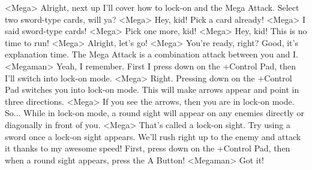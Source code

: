 <Mega> Alright, next up I'll cover how to lock-on and the Mega Attack. 
Select two sword-type cards, will ya? 
<Mega> Hey, kid! Pick a card already! 
<Mega> I said sword-type cards! 
<Mega> Pick one more, kid! 
<Mega> Hey, kid! This is no time to run! 
<Mega> Alright, let's go! 
<Mega> You're ready, right? Good, it's explanation time. 
The Mega Attack is a combination attack between you and I. 
<Megaman> Yeah, I remember. 
First I press down on the +Control Pad, then I'll switch into lock-on mode. 
<Mega> Right. Pressing down on the +Control Pad switches you into lock-on mode. 
This will make arrows appear and point in three directions. 
<Mega> If you see the arrows, then you are in lock-on mode. So... 
While in lock-on mode, a round sight will appear on 
any enemies directly or diagonally in front of you. 
<Mega> That's called a lock-on sight. Try using a sword once a lock-on sight appears. 
We'll rush right up to the enemy and attack it thanks to my awesome speed! 
First, press down on the +Control Pad, then when a 
round sight appears, press the A Button! 
<Megaman> Got it! 
